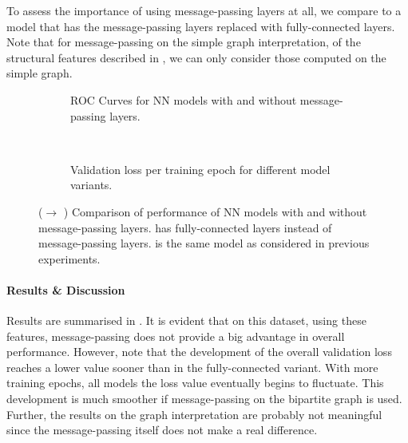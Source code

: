 \documentclass[
	fontsize=10pt, %
	twoside=false, %
	secnumdepth=1, %
  toc=indentunnumbered %
]{kaobook}
\begin{document}
To assess the importance of using message-passing layers at all, we compare to a
model that has the message-passing layers replaced with fully-connected layers.
Note that for message-passing on the simple graph interpretation, of the
structural features described in , we can only
consider those computed on the simple graph.

\begin{figure}[h]
  \centering
  \begin{subfigure}[h]{0.48\linewidth}
    \caption{ROC Curves for NN models with and without message-passing layers.}
  \end{subfigure}
  ~~
  \begin{subfigure}[h]{0.48\linewidth}
    \caption{Validation loss per training epoch for different model variants.}
  \end{subfigure}
  \caption{(\ADLast $\rightarrow$ \PDMap) Comparison of performance of NN models
    with and without message-passing layers.  has
    fully-connected layers instead of message-passing layers.
     is the same model as considered in previous
    experiments. }
  \label{fig:importance-message-passing}
\end{figure}

\paragraph{Results \& Discussion} Results are summarised in
. It is evident that on this dataset,
using these features, message-passing does not provide a big
advantage in overall performance.
However, note that the development of the overall validation loss reaches a
lower value sooner than in the fully-connected variant. With more training
epochs, all models the loss value eventually begins to fluctuate. This
development is much smoother if message-passing on the bipartite graph is used.
Further, the results on the graph interpretation are probably not meaningful
since the message-passing itself does not make a real difference.
\end{document}
